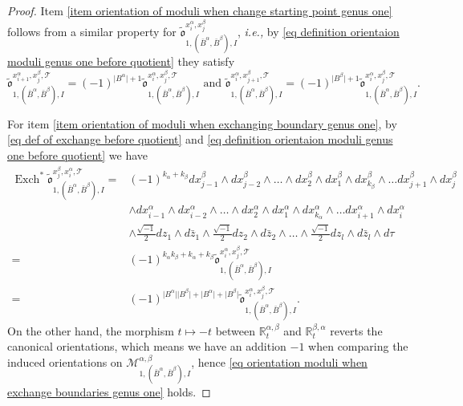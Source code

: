 \documentclass[11pt,a4paper]{article}
\theoremstyle{definition}
\theoremstyle{remark}
\numberwithin{equation}{section}
\begin{document}
\begin{proof}
    Item \ref{item orientation of moduli when change starting point genus one} follows from a similar property for $\tilde{\mathfrak o}^{x^\alpha_i,x^\beta_j}_{1,(\bar{B}^\alpha,\bar{B}^\beta),I}$, \textit{i.e.,} by \eqref{eq definition orientaion moduli genus one before quotient} they satisfy 
    $$\tilde{\mathfrak o}^{x^\alpha_{i+1},x^\beta_j,\mathcal T}_{1,(\bar{B}^\alpha,\bar{B}^\beta),I}=(-1)^{\lvert B^\alpha \rvert+1}\tilde{\mathfrak o}^{x^\alpha_{i},x^\beta_j,\mathcal T}_{1,(\bar{B}^\alpha,\bar{B}^\beta),I}
    \text{ and }\tilde{\mathfrak o}^{x^\alpha_{i},x^\beta_{j+1},\mathcal T}_{1,(\bar{B}^\alpha,\bar{B}^\beta),I}=(-1)^{\lvert B^\beta \rvert+1}\tilde{\mathfrak o}^{x^\alpha_{i},x^\beta_j,\mathcal T}_{1,(\bar{B}^\alpha,\bar{B}^\beta),I}.$$


    For item \ref{item orientation of moduli when exchanging boundary genus one}, by \eqref{eq def of exchange before quotient} and \eqref{eq definition orientaion moduli genus one before quotient} we have
    \begin{equation*}
        \begin{split}
            \operatorname{Exch}^*\tilde{\mathfrak o}^{x^\beta_j,x^\alpha_{i},\mathcal T}_{1,(\bar{B}^\alpha,\bar{B}^\beta),I}=
    &(-1)^{k_\alpha+k_\beta}dx^\beta_{j-1}\wedge dx^\beta_{j-2}\wedge\dots\wedge dx^\beta_{2}\wedge dx^\beta_{1} \wedge dx^\beta_{k_\beta} \wedge\dots dx^\beta_{j+1}\wedge dx^\beta_{j}\\
    & \wedge  dx^\alpha_{i-1}\wedge dx^\alpha_{i-2}\wedge\dots\wedge dx^\alpha_{2}\wedge dx^\alpha_{1} \wedge dx^\alpha_{k_\alpha} \wedge\dots dx^\alpha_{i+1}\wedge dx^\alpha_{i}\\
    &\wedge \frac{\sqrt{-1}}{2}dz_1\wedge d\bar{z}_1\wedge  \frac{\sqrt{-1}}{2}dz_2\wedge d\bar{z}_2\wedge \dots \wedge \frac{\sqrt{-1}}{2}dz_l\wedge d\bar{z}_l \wedge d\tau\\
            =&(-1)^{k_\alpha k_\beta +k_\alpha+k_\beta}\tilde{\mathfrak o}^{x^\alpha_{i},x^\beta_j,\mathcal T}_{1,(\bar{B}^\alpha,\bar{B}^\beta),I}\\
            =&(-1)^{\lvert B^\alpha \rvert\lvert B^\beta \rvert+\lvert B^\alpha \rvert+\lvert B^\beta\rvert}\tilde{\mathfrak o}^{x^\alpha_{i},x^\beta_j,\mathcal T}_{1,(\bar{B}^\alpha,\bar{B}^\beta),I}.
        \end{split}
    \end{equation*}
    On the other hand, the morphism $t\mapsto -t$ between $\mathbb R_t^{\alpha,\beta}$ and $\mathbb R_t^{\beta,\alpha}$ reverts the canonical orientations, which means we have an addition $-1$ when comparing the induced orientations on $\mathcal M^{\alpha,\beta}_{1,(\bar{B}^\alpha,\bar{B}^\beta),I}$, hence \eqref{eq orientation moduli when exchange boundaries genus one} holds.


\end{proof}
\end{document}
